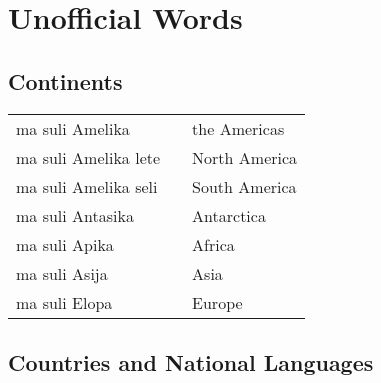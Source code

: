 
\section{Unofficial Words}
\label{'unofficial_words'}

\subsection*{Continents}

\begin{supertabular}{p{4,5cm}|ll}
    ma suli Amelika      &  & the Americas  \\
    ma suli Amelika lete &  & North America \\
    ma suli Amelika seli &  & South America \\
    ma suli Antasika     &  & Antarctica    \\
    ma suli Apika        &  & Africa        \\
    ma suli Asija        &  & Asia          \\
    ma suli Elopa        &  & Europe        \\
\end{supertabular}

\subsection*{Countries and National Languages}

